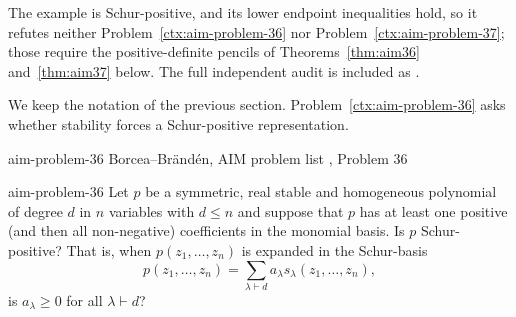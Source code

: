 \begin{cxrefutation}
\begin{remark}[Scope]
The example is Schur-positive, and its lower endpoint inequalities hold, so it refutes neither Problem~\ref{ctx:aim-problem-36} nor Problem~\ref{ctx:aim-problem-37}; those require the positive-definite pencils of Theorems~\ref{thm:aim36} and~\ref{thm:aim37} below.  The full independent audit is included as .
\end{remark}
\end{cxrefutation}



\begin{cxcredits}
\end{cxcredits}

\begin{cxrefutation}
  We keep the notation of the previous section. %
Problem~\ref{ctx:aim-problem-36} asks whether stability forces a Schur-positive representation. %
\end{cxrefutation}


\begin{cxsource}{aim-problem-36}
Borcea--Br\"and\'en, AIM problem list \citeyearpar{AIMStableProblems}, Problem 36
\end{cxsource}

\begin{cxstatement}{aim-problem-36}
Let $p$ be a symmetric, real stable and homogeneous polynomial of degree $d$ in $n$ variables with $d\le n$ and suppose that $p$ has at least one positive (and then all non-negative) coefficients in the monomial basis.  Is $p$ Schur-positive?  That is, when $p(z_1,\ldots,z_n)$ is expanded in the Schur-basis
\[p(z_1,\ldots,z_n)=\sum_{\lambda\vdash d}a_\lambda s_\lambda(z_1,\ldots,z_n),\]
is $a_\lambda\ge0$ for all $\lambda\vdash d$?
\end{cxstatement}

